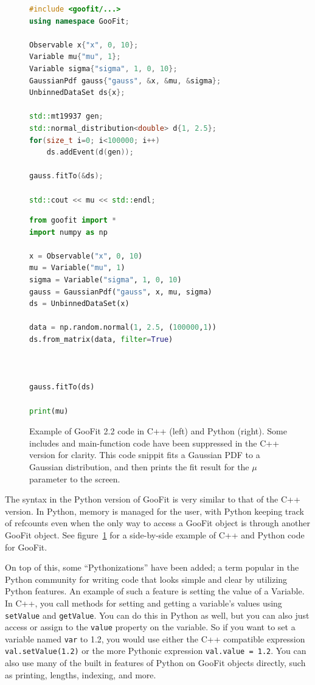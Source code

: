 \documentclass{webofc}
\begin{document}
\begin{figure}[h]
	    \begin{minipage}{.51\textwidth}
		\begin{lstlisting}[language=C++]
#include <goofit/...>
using namespace GooFit;

Observable x{"x", 0, 10};
Variable mu{"mu", 1};
Variable sigma{"sigma", 1, 0, 10};
GaussianPdf gauss{"gauss", &x, &mu, &sigma};
UnbinnedDataSet ds{x};

std::mt19937 gen;
std::normal_distribution<double> d{1, 2.5};
for(size_t i=0; i<100000; i++)
	ds.addEvent(d(gen));

gauss.fitTo(&ds);

std::cout << mu << std::endl;
		\end{lstlisting}
	    \end{minipage}%
	    \begin{minipage}{.49\textwidth}
		\begin{lstlisting}[language=Python] 
from goofit import *
import numpy as np

x = Observable("x", 0, 10)
mu = Variable("mu", 1)
sigma = Variable("sigma", 1, 0, 10)
gauss = GaussianPdf("gauss", x, mu, sigma)
ds = UnbinnedDataSet(x)

data = np.random.normal(1, 2.5, (100000,1))
ds.from_matrix(data, filter=True)



gauss.fitTo(ds)

print(mu)
		\end{lstlisting}
	    \end{minipage}
	\caption{Example of GooFit 2.2 code in C++ (left) and Python (right). Some includes and main-function code have been suppressed in the C++ version for clarity. This code snippit fits a Gaussian PDF to a Gaussian distribution, and then prints the fit result for the $\mu$ parameter to the screen.}
	\label{fig-code}
\end{figure}

The syntax in the Python version of GooFit is very similar to that of the C++ version. In Python, memory is managed for the user, with Python keeping track of refcounts even when the only way to access a GooFit object is through another GooFit object.  See figure~\ref{fig-code} for a side-by-side example of C++ and Python code for GooFit.

On top of this, some ``Pythonizations'' have been added; a term popular in the Python community for writing code that looks simple and clear by utilizing Python features. An example of such a feature is setting the value of a Variable. In C++, you call  methods for setting and getting a variable's values using \texttt{setValue} and \texttt{getValue}. You can do this in Python as well, but you can also just access or assign to the \texttt{value} property on the variable. So if you want to set a variable named \lstinline|var| to 1.2, you would use either the C++ compatible expression \lstinline|val.setValue(1.2)| or the more Pythonic expression \lstinline|val.value = 1.2|. You can also use many of the built in features of Python on GooFit objects directly, such as printing, lengths, indexing, and more.
\end{document}
